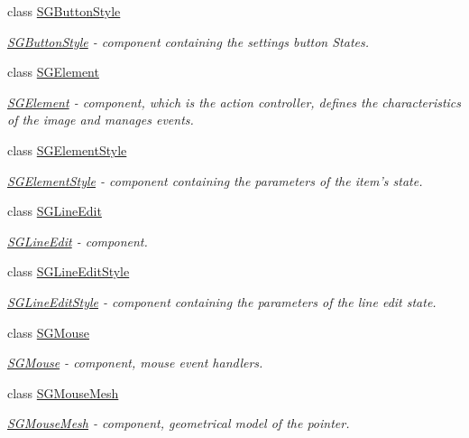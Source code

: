 \begin{DoxyCompactItemize}
class \hyperlink{classcsad_1_1_s_g_button_style}{S\-G\-Button\-Style}
\begin{DoxyCompactList}\small\item\em \hyperlink{classcsad_1_1_s_g_button_style}{S\-G\-Button\-Style} -\/ component containing the settings button States. \end{DoxyCompactList}\item 
class \hyperlink{classcsad_1_1_s_g_element}{S\-G\-Element}
\begin{DoxyCompactList}\small\item\em \hyperlink{classcsad_1_1_s_g_element}{S\-G\-Element} -\/ component, which is the action controller, defines the characteristics of the image and manages events. \end{DoxyCompactList}\item 
class \hyperlink{classcsad_1_1_s_g_element_style}{S\-G\-Element\-Style}
\begin{DoxyCompactList}\small\item\em \hyperlink{classcsad_1_1_s_g_element_style}{S\-G\-Element\-Style} -\/ component containing the parameters of the item's state. \end{DoxyCompactList}\item 
class \hyperlink{classcsad_1_1_s_g_line_edit}{S\-G\-Line\-Edit}
\begin{DoxyCompactList}\small\item\em \hyperlink{classcsad_1_1_s_g_line_edit}{S\-G\-Line\-Edit} -\/ component. \end{DoxyCompactList}\item 
class \hyperlink{classcsad_1_1_s_g_line_edit_style}{S\-G\-Line\-Edit\-Style}
\begin{DoxyCompactList}\small\item\em \hyperlink{classcsad_1_1_s_g_line_edit_style}{S\-G\-Line\-Edit\-Style} -\/ component containing the parameters of the line edit state. \end{DoxyCompactList}\item 
class \hyperlink{classcsad_1_1_s_g_mouse}{S\-G\-Mouse}
\begin{DoxyCompactList}\small\item\em \hyperlink{classcsad_1_1_s_g_mouse}{S\-G\-Mouse} -\/ component, mouse event handlers. \end{DoxyCompactList}\item 
class \hyperlink{classcsad_1_1_s_g_mouse_mesh}{S\-G\-Mouse\-Mesh}
\begin{DoxyCompactList}\small\item\em \hyperlink{classcsad_1_1_s_g_mouse_mesh}{S\-G\-Mouse\-Mesh} -\/ component, geometrical model of the pointer. \end{DoxyCompactList}\item 

\end{DoxyCompactItemize}
